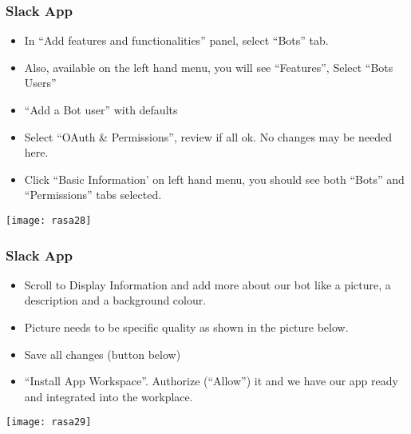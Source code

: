 \begin{frame}[fragile]\frametitle{Slack App}
\begin{itemize}
\item In ``Add features and functionalities'' panel, select ``Bots'' tab.
\item Also, available on the left hand menu, you will see ``Features'', Select ``Bots Users''
\item ``Add a Bot user'' with defaults
\item Select ``OAuth \& Permissions'', review if all ok. No changes may be needed here.
\item Click ``Basic Information' on left hand menu, you should see both ``Bots'' and ``Permissions'' tabs selected.
\end{itemize}

\begin{center}
\texttt{[image: rasa28]}
\end{center}
\end{frame}

\begin{frame}[fragile]\frametitle{Slack App}
\begin{itemize}
\item Scroll to Display Information and add more about our bot like a picture, a description and a background colour.
\item Picture needs to be specific quality as shown in the picture below.
\item Save all changes (button below)
\item ``Install App Workspace''. Authorize (``Allow'') it and we have our app ready and integrated into the workplace.
\end{itemize}

\begin{center}
\texttt{[image: rasa29]}
\end{center}
\end{frame}

